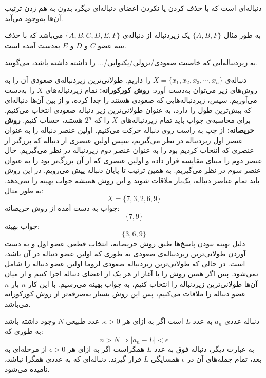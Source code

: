 \begin{DEFINITION}
\p
دنباله‌ای است که با حذف کردن یا نکردن اعضای دنباله‌ای دیگر، بدون به هم زدن ترتیب آن‌ها به‌وجود می‌آید.
\end{DEFINITION}
\p
به طور مثال
$\{A, B, F\}$
یک زیردنباله از دنباله‌ی
$\{A, B, C, D, E, F\}$
می‌باشد که با حذف سه عضو 
$C$
و
$D$
و
$E$
به‌دست آمده است.


 \begin{DEFINITION}
 \p
 به زیردنباله‌ایی که خاصیت صعودی/نزولی/یکنوایی/... را داشته داشته باشد، 
 می‌گویند.
\end{DEFINITION} 

\p
دنباله‌ی
 $X = \{x_1, x_2, x_3, \cdots, x_n\}$
را داریم. طولانی‌ترین زیردنباله‌ی صعودی
آن را به روش‌های زیر می‌توان به‌دست آورد:
\p
\textbf{روش کورکورانه:} 
تمام زیردنباله‌های
$X$
را به‌دست می‌آوریم. سپس، زیردنباله‌هایی که صعودی هستند را جدا کرده،
و از بين آن‌ها دنباله‌ای که بيش‌ترین طول را دارد، به عنوان طولانی‌ترین زیر دنباله صعودی انتخاب می‌کنيم.
برای محاسبه‌ی جواب باید تمام زیردنباله‌های
$X$
 را که
 $2^n$
 هستند، حساب کنیم.
\p
\textbf{روش حریصانه:} 
از چپ به راست روی دنباله حرکت می‌کنيم. اولين عنصر دنباله را به عنوان عنصر اول زیردنباله در نظر می‌گيریم، سپس اولين عنصری از دنباله که بزرگتر از عنصری که انتخاب کردیم بود را به عنوان عنصر دوم زیردنباله در نظر می‌گيریم. حال عنصر دوم را مبنای مقایسه قرار داده و اولین عنصری که از آن بزرگ‌تر بود را به عنوان عنصر سوم در نظر می‌گیریم. به همين ترتيب تا پایان دنباله پيش می‌رویم. در این روش  باید تمام عناصر دنباله، یک‌بار ملاقات شوند و این روش هميشه جواب بهينه را نمی‌دهد. به طور مثال:
 $$X = \{7, 3 ,2 ,6 ,9\}$$
جواب به دست آمده از روش حریصانه:
 $$\{7, 9\}$$
جواب بهينه:
$$\{3, 6, 9\}$$
\p
دلیل بهینه نبودن پاسخ‌ها طبق روش حریصانه، انتخاب قطعی عضو اول و به دست آوردن طولانی‌ترین زیردنباله‌ی صعودی به طوری که اولین عضو دنباله در آن باشد، است. در حالی که طولانی‌ترین زیردنباله صعودی لزوما اولین عضو دنباله را شامل نمی‌شود. پس اگر همین روش را با آغاز از هر یک از اعضای دنباله اجرا کنیم و از میان آن‌ها طولانی‌ترین زیردنباله را انتخاب کنیم، به جواب بهینه می‌رسیم. با این کار
$n$
بار
$n$
عضو دنباله را ملاقات می‌کنیم، پس این روش بسیار به‌صرفه‌تر از روش کورکورانه می‌باشد.


\begin{DEFINITION}
	\p
دنباله عددی
$a_n$
 به عدد 
$L$
است اگر به ازای هر
$\epsilon > 0$،
عدد طبیعی
$N$
وجود داشته باشد به طوری که:
$$n > N \Rightarrow |a_n - L| < \epsilon$$
به عبارت دیگر، دنباله فوق به عدد
$L$
همگراست اگر به ازای هر
$\epsilon > 0$
از مرحله‌ای به بعد، تمام جمله‌های آن در
$\epsilon$
 همسایگی
$L$
 قرار گیرند. دنباله‌ای که به عددی همگرا نباشد، 
  نامیده می‌شود.
\end{DEFINITION}

